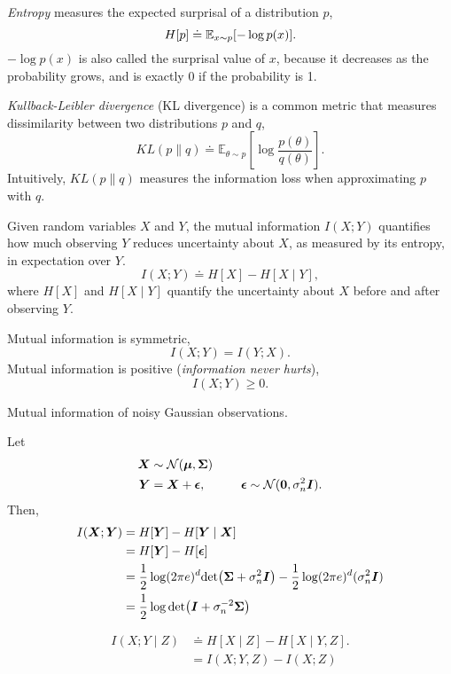 \begin{definition}[Entropy]
  \textit{Entropy} measures the expected surprisal of a distribution $p$, \[
    H[p] \doteq \mathbb{E}_{x\sim p}[-\log p(x)]
  .\]
  $-\log p(x)$ is also called the surprisal value of $x$, because it decreases
  as the probability grows, and is exactly 0 if the probability is 1.
\end{definition}

\begin{definition}
  \textit{Kullback-Leibler divergence} (KL divergence) is a common metric that
  measures dissimilarity between two distributions $p$ and $q$, \[
    KL(p \| q) \doteq \mathbb{E}_{\theta\sim p} \left[ \log \frac{p(\theta)}{q(\theta)} \right]
  .\]
  Intuitively, $KL(p \| q)$ measures the information loss when approximating
  $p$ with $q$.
\end{definition}

\begin{definition}
  Given random variables $X$ and $Y$, the mutual information $I(X;Y)$
  quantifies how much observing $Y$ reduces uncertainty about $X$, as
  measured by its entropy, in expectation over $Y$. \[
    I(X;Y) \doteq H[X] - H[X \mid Y]
  ,\]
  where $H[X]$ and $H[X\mid Y]$ quantify the uncertainty about $X$ before and
  after observing $Y$.
\end{definition}

\begin{properties}
  Mutual information is symmetric, \[
    I(X;Y) = I(Y;X)
  .\]
  Mutual information is positive (\textit{information never hurts}), \[
    I(X;Y) \geq 0
  .\]
\end{properties}

\begin{example}
  \caption{Mutual information of noisy Gaussian observations.}

  Let 
  \begin{align*}
    \bm{X} &\sim \mathcal{N}(\bm{\mu},\bm{\Sigma}) \\
    \bm{Y} &= \bm{X}+\bm{\epsilon}, \hspace{1cm} \bm{\epsilon} \sim \mathcal{N}(\bm{0}, \sigma_n^2 \bm{I})
  .\end{align*}
  Then,
  \begin{align*}
    I(\vec{X};\vec{Y}) &= H[\vec{Y}] - H[\vec{Y}\mid \vec{X}] \\
    &= H[\vec{Y}] - H[\vec{\epsilon}] \\
    &= \frac{1}{2}\log(2\pi e)^d \det{\mat{\Sigma} + \sigma_n^2 \mat{I}} - \frac{1}{2}\log(2\pi e)^d(\sigma_n^2 \mat{I}) \\
    &= \frac{1}{2} \log \det{\mat{I} + \sigma_n^{-2}\mat{\Sigma}}
  \end{align*}
\end{example}

\begin{definition}
  \begin{align*}
    I(X;Y\mid Z) &\doteq H[X\mid Z] - H[X\mid Y,Z]. \\
    &= I(X;Y,Z) - I(X;Z)
  \end{align*}
\end{definition}
